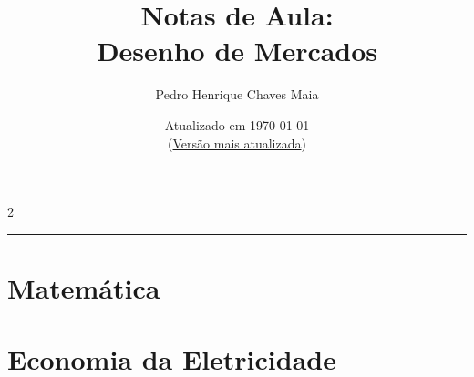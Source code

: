 




\frontmatter
\title{\bf \huge Notas de Aula: \\
        Desenho de Mercados}
\author{Pedro Henrique Chaves Maia}
\date{Atualizado em \today \\ (\href{https://gvmail-my.sharepoint.com/:b:/g/personal/b30993_fgv_edu_br/EdV2A8MLs21Fto6W-hhC1M0Be7SeWx1q7JrGajWqVmkwbw?e=iTQJT1}{{\sc Versão mais atualizada}})}
\maketitle
\setcounter{tocdepth}{2}

\begin{multicols*}{2}
    \tableofcontents
    \label{toc-contents}
\end{multicols*}

%
    {\noindent\rule{\linewidth}{0.5pt}\baselineskip}
    
\mainmatter %


\part{Matemática}


\part{Economia da Eletricidade}








%
% 

%

\backmatter


\printbibliography[heading=bibintoc]
\printindex



